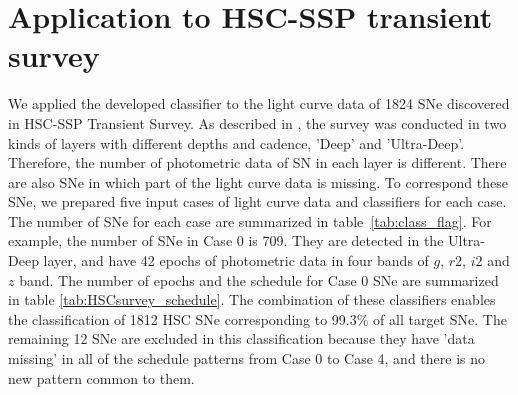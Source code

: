 \documentclass[useamsfonts]{pasj01}
\begin{document}
\section{Application to HSC-SSP transient survey}
\label{sec:h}
%
We applied the developed classifier to the light curve data of 1824 SNe discovered in HSC-SSP Transient Survey.
As described in \citet{yasuda19a}, the survey %
was conducted in two kinds of layers with different depths and cadence, 
'Deep' and 'Ultra-Deep'.
Therefore, the number of photometric data of SN in each layer is different.
There are also SNe in which part of the light curve data is missing.
To correspond these SNe, we prepared five input cases of light curve data and classifiers for each case.
The number of SNe for each case are summarized in table\ \ref{tab:class_flag}.
For example, the number of SNe in Case 0 is 709.
They are detected in the Ultra-Deep layer, and have 42 epochs of photometric data in four bands of $g$, $r2$, $i2$ and $z$ band.
The number of epochs and the schedule for Case 0 SNe are summarized in table \ref{tab:HSCsurvey_schedule}.
The combination of these classifiers enables the classification of 1812 HSC SNe corresponding to 99.3\% of all target SNe.
The remaining 12 SNe are excluded in this classification because they have 'data missing' in all of the schedule patterns from Case 0 to Case 4, and there is no new pattern common to them.
\end{document}
